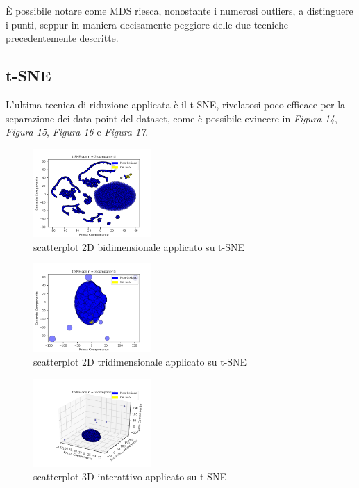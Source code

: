 \documentclass[11pt,a4paper,twocolumn]{article}
\begin{document}
	È possibile notare come MDS riesca, nonostante i numerosi outliers, a distinguere i punti, seppur in maniera decisamente peggiore delle due tecniche precedentemente descritte.

	\subsection{t-SNE}

	L'ultima tecnica di riduzione applicata è il t-SNE, rivelatosi poco efficace per la separazione dei data point del dataset, come è possibile evincere in \emph{Figura 14}, \emph{Figura 15}, \emph{Figura 16} e \emph{Figura 17}.

	\begin{figure}[H]
		\centering
		\includegraphics[width=0.4\textwidth]{img/tSNE_2Dnc2.png}
		\caption{scatterplot 2D bidimensionale applicato su t-SNE}
	\end{figure}

	\begin{figure}[H]
		\centering
		\includegraphics[width=0.4\textwidth]{img/tSNE_2Dnc3.png}
		\caption{scatterplot 2D tridimensionale applicato su t-SNE}
	\end{figure}

	\begin{figure}[H]
		\centering
		\includegraphics[width=0.4\textwidth]{img/tSNE_i3D.png}
		\caption{scatterplot 3D interattivo applicato su t-SNE}
	\end{figure}
\end{document}

